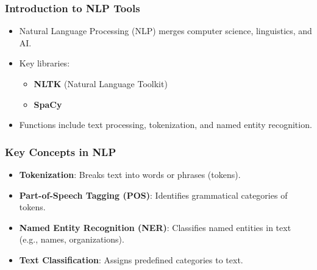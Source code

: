 \documentclass{beamer}
\begin{document}
\begin{frame}
    \titlepage
\end{frame}

\begin{frame}
    \frametitle{Introduction to NLP Tools}
    \begin{itemize}
        \item Natural Language Processing (NLP) merges computer science, linguistics, and AI.
        \item Key libraries: 
            \begin{itemize}
                \item \textbf{NLTK} (Natural Language Toolkit)
                \item \textbf{SpaCy}
            \end{itemize}
        \item Functions include text processing, tokenization, and named entity recognition.
    \end{itemize}
\end{frame}

\begin{frame}
    \frametitle{Key Concepts in NLP}
    \begin{itemize}
        \item \textbf{Tokenization}: Breaks text into words or phrases (tokens).
        \item \textbf{Part-of-Speech Tagging (POS)}: Identifies grammatical categories of tokens.
        \item \textbf{Named Entity Recognition (NER)}: Classifies named entities in text (e.g., names, organizations).
        \item \textbf{Text Classification}: Assigns predefined categories to text.
    \end{itemize}
\end{frame}
\end{document}
